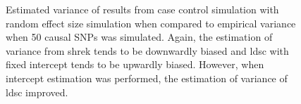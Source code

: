 \begin{figure}
{				
				\label{fig:ldscInCC50RandVarCom}
			}
			\caption[Estimation of Variance in Case Control Simulation (50 Causal)]
			{Estimated variance of results from case control simulation with random effect size simulation when compared to empirical variance when 50 causal \glspl{SNP} was simulated.
				Again, the estimation of variance from \gls{shrek} tends to be downwardly biased and \gls{ldsc} with fixed intercept tends to be upwardly biased. 
				However, when intercept estimation was performed, the estimation of variance of \gls{ldsc} improved.
			} 
			\label{fig:CC50RandVarCom}
		\end{figure}